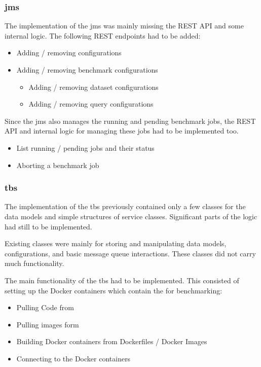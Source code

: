 \subsubsection{\acl{jms}}
The implementation of the \acl{jms} was mainly missing the REST API and some internal logic.
The following REST endpoints had to be added:

\begin{itemize}
	\item Adding / removing \ts{} configurations
	
	\item Adding / removing benchmark configurations
		\begin{itemize}
			\item Adding / removing dataset configurations
			
			\item Adding / removing query configurations
		\end{itemize}
\end{itemize}

Since the \ac{jms} also manages the running and pending benchmark jobs, the REST API and internal logic for managing these jobs had to be implemented too.

\begin{itemize}
	\item List running / pending jobs and their status
	
	\item Aborting a benchmark job
\end{itemize}



\subsubsection{\acl{tbs}}
The implementation of the \acl{tbs} previously contained only a few classes for the data models and simple structures of service classes.
Significant parts of the logic had still to be implemented.

Existing classes were mainly for storing and manipulating data models, configurations, and basic message queue interactions.
These classes did not carry much functionality.

The main functionality of the \ac{tbs} had to be implemented.
This consisted of setting up the Docker containers which contain the \tsp{} for benchmarking:

\begin{itemize}
	\item Pulling Code from \gh{}
	\item Pulling images form \dockh{}
	
	\item Building Docker containers from Dockerfiles / Docker Images
	
	\item Connecting to the Docker containers
\end{itemize}

